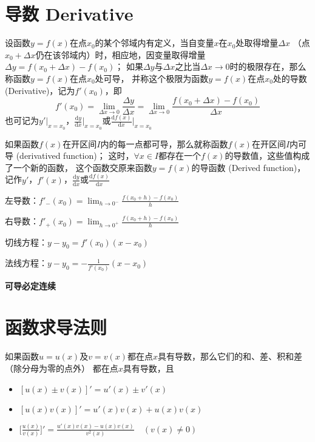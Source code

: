 \documentclass[UTF8]{ctexart}
\newcommand{\D}{\text{d}}
\begin{document}
\section*{导数 Derivative}

\bigskip

设函数$y=f(x)$在点$x_0$的某个邻域内有定义，当自变量$x$在$x_0$处取得增量$\Delta x$
（点$x_0+\Delta x$仍在该邻域内）时，相应地，因变量取得增量$\Delta y=f(x_0+\Delta x)-f(x_0)$；
如果$\Delta y$与$\Delta x$之比当$\Delta x\to0$时的极限存在，那么称函数$y=f(x)$在点$x_0$处可导，
并称这个极限为函数$y=f(x)$在点$x_0$处的导数 (Derivative)，记为$f'(x_0)$，即
\[ f'(x_0)=\lim_{\Delta x\to0}\frac{\Delta y}{\Delta x}=\lim_{\Delta x\to0}\frac{f(x_0+\Delta x)-f(x_0)}{\Delta x} \]
也可记为$y'|_{x=x_0}$，$\frac{\text{d}y}{\text{d}x}\big|_{x=x_0}$或$\frac{\text{d}f(x)}{\text{d}x}\big|_{x=x_0}$

\bigskip

如果函数$f(x)$在开区间$I$内的每一点都可导，那么就称函数$f(x)$在开区间$I$内可导 (derivatived function)；
这时，$\forall x\in I$都存在一个$f(x)$的导数值，这些值构成了一个新的函数，
这个函数交原来函数$y=f(x)$的导函数 (Derived function)，记作$y'$，$f'(x)$，$\frac{\D y}{\D x}$或$\frac{\D f(x)}{\D x}$

\bigskip

左导数：$f'_-(x_0)=\lim_{h\to0^-}\frac{f(x_0+h)-f(x_0)}{h}$

右导数：$f'_+(x_0)=\lim_{h\to0^+}\frac{f(x_0+h)-f(x_0)}{h}$

\bigskip

切线方程：$y-y_0=f'(x_0)(x-x_0)$

法线方程：$y-y_0=-\frac{1}{f'(x_0)}(x-x_0)$

\bigskip

\textbf{可导必定连续}
\bigskip
\bigskip

\section*{函数求导法则}

\bigskip

如果函数$u=u(x)$及$v=v(x)$都在点$x$具有导数，那么它们的和、差、积和差（除分母为零的点外）
都在点$x$具有导数，且

\begin{itemize}
  \item $[u(x)\pm v(x)]'=u'(x)\pm v'(x)$
  \item $[u(x)v(x)]'=u'(x)v(x)+u(x)v(x)$
  \item $\big[\frac{u(x)}{v(x)}\big]'=\frac{u'(x)v(x)-u(x)v(x)}{v^2(x)}\quad(v(x)\ne0)$
\end{itemize}
\end{document}
